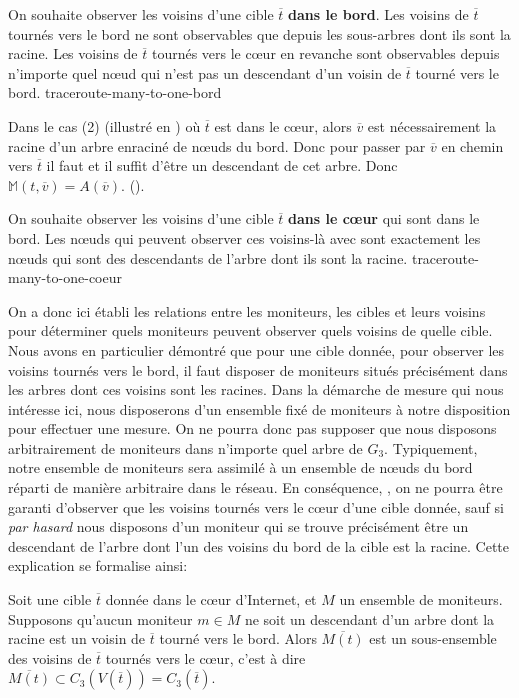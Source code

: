  {On souhaite observer les voisins d'une cible $\overline{t}$
{\bf dans le bord}. Les voisins de $\overline{t}$ tournés vers le bord ne sont
observables que depuis les sous-arbres dont ils sont la racine. Les voisins de
$\overline{t}$ tournés vers le cœur en revanche sont observables depuis
n'importe quel n\oe{}ud qui n'est pas un descendant d'un voisin de $\overline{t}$
tourné vers le bord.} {traceroute-many-to-one-bord}

Dans le cas (2) (illustré en ) où
$\overline{t}$ est dans le cœur, alors $\overline{v}$ est nécessairement la
racine d'un arbre enraciné de n\oe{}uds du bord. Donc pour passer par
$\overline{v}$ en chemin vers $\overline{t}$ il faut et il suffit d'être un
descendant de cet arbre. Donc $\mathbb{M}(t, \overline{v}) = A(\overline{v})$.
().

 {On souhaite observer les voisins d'une cible $\overline{t}$ {\bf dans
le cœur} qui sont dans le bord. Les n\oe{}uds qui peuvent observer ces
voisins-là avec \traceroute sont exactement les n\oe{}uds qui sont des
descendants de l'arbre dont ils sont la racine.} {traceroute-many-to-one-coeur}

On a donc ici établi les relations entre les moniteurs, les cibles et leurs
voisins pour déterminer quels moniteurs peuvent observer quels voisins de quelle
cible. Nous avons en particulier démontré que pour une cible donnée, pour
observer les voisins tournés vers le bord, il faut disposer de moniteurs situés
précisément dans les arbres dont ces voisins sont les racines. Dans la démarche
de mesure qui nous intéresse ici, nous disposerons d'un ensemble fixé de
moniteurs à notre disposition pour effectuer une mesure. On ne pourra donc pas
supposer que nous disposons arbitrairement de moniteurs dans n'importe quel
arbre de $G_3$. Typiquement, notre ensemble de moniteurs sera assimilé à un
ensemble de n\oe{}uds du bord réparti de manière arbitraire dans le réseau. En
conséquence, \apriori, on ne pourra être garanti d'observer que les voisins
tournés vers le cœur d'une cible donnée, sauf si {\em par hasard} nous
disposons d'un moniteur qui se trouve précisément être un descendant de l'arbre
dont l'un des voisins du bord de la cible est la racine. Cette explication se
formalise ainsi:

\begin{proposition}
Soit une cible $\overline{t}$ donnée dans le cœur d'Internet, et $M$ un
ensemble de moniteurs. Supposons qu'aucun moniteur $m \in M$ ne soit un
descendant d'un arbre dont la racine est un voisin de $\overline{t}$ tourné vers
le bord. Alors $\overline{M(t)}$ est un sous-ensemble des voisins de
$\overline{t}$ tournés vers le cœur, c'est à dire $\overline{M(t)} \subset
C_3(V(\overline{t})) = C_3(\overline{t})$.
\label{prop:traceroute-many-to-one-core}
\end{proposition} 

